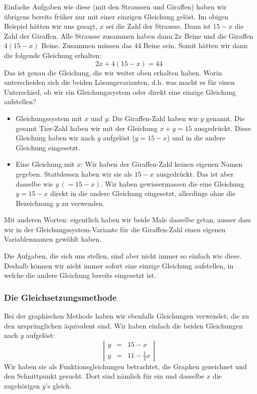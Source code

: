 \documentclass[%
11pt,%
twoside,%
titlepage,%
german,%
]{scrartcl}
\newenvironment{system}{\begin{displaymath}
  \left| 
    \begin{array}{rcl}}{\end{array} \right| 
\end{displaymath}}
\begin{document}
Einfache Aufgaben wie diese (mit den Straussen und Giraffen) haben wir \"ubrigens bereits fr\"uher nur mit einer einzigen Gleichung gel\"ost. Im obigen Beispiel h\"atten wir uns gesagt, $x$ sei die Zahl der Strausse. Dann ist $15-x$ die Zahl der Giraffen. Alle Strausse zusammen haben dann $2x$ Beine und die Giraffen $4(15-x)$ Beine. Zusammen m\"ussen das 44 Beine sein. Somit h\"atten wir dann die folgende Gleichung erhalten:
\begin{displaymath}
  2x + 4(15-x)=44
\end{displaymath}
Das ist genau die Gleichung, die wir weiter oben erhalten haben. Worin unterscheiden sich die beiden L\"osungsvarianten, d.h. was macht es f\"ur einen Unterschied, ob wir ein Gleichungssystem oder direkt eine einzige Gleichung aufstellen?
\begin{itemize}
\item Gleichungssystem mit $x$ und $y$: Die Giraffen-Zahl haben wir $y$ genannt. Die gesamt Tier-Zahl haben wir mit der Gleichung $x+y=15$ ausgedr\"uckt. Diese Gleichung haben wir nach $y$ aufgel\"ost ($y=15-x$) und in die andere Gleichung eingesetzt.
\item Eine Gleichung mit $x$: Wir haben der Giraffen-Zahl keinen eigenen Namen gegeben. Stattdessen haben wir sie als $15-x$ ausgedr\"uckt. Das ist aber dasselbe wie $y\,(=15-x)$. Wir haben gewissermassen die eine Gleichung $y=15-x$ direkt in die andere Gleichung eingesetzt, allerdings ohne die Bezeichnung $y$ zu verwenden.
\end{itemize}
Mit anderen Worten: eigentlich haben wir beide Male dasselbe getan, ausser dass wir in der Gleichungssystem-Variante f\"ur die Giraffen-Zahl einen eigenen Variablennamen gew\"ahlt haben.

Die Aufgaben, die sich uns stellen, sind aber nicht immer so einfach wie diese. Deshalb k\"onnen wir nicht immer sofort eine einzige Gleichung aufstellen, in welche die andere Gleichung bereits eingesetzt ist.


\subsubsection{Die Gleichsetzungsmethode}
\label{linglsyst:algebraisch:gleichsetzung}

Bei der graphischen Methode haben wir ebenfalls Gleichungen verwendet, die zu den urspr\"unglichen \"aquivalent sind. Wir haben einfach die beiden Gleichungen nach $y$ aufgel\"ost:
\begin{system}
  y & = & 15-x \\
  y & = & 11-\frac{1}{2}x
\end{system}
Wir haben sie als Funktionsgleichungen betrachtet, die Graphen gezeichnet und den Schnittpunkt gesucht. Dort sind n\"amlich f\"ur ein und dasselbe $x$ die zugeh\"origen $y$'s gleich.
\end{document}
